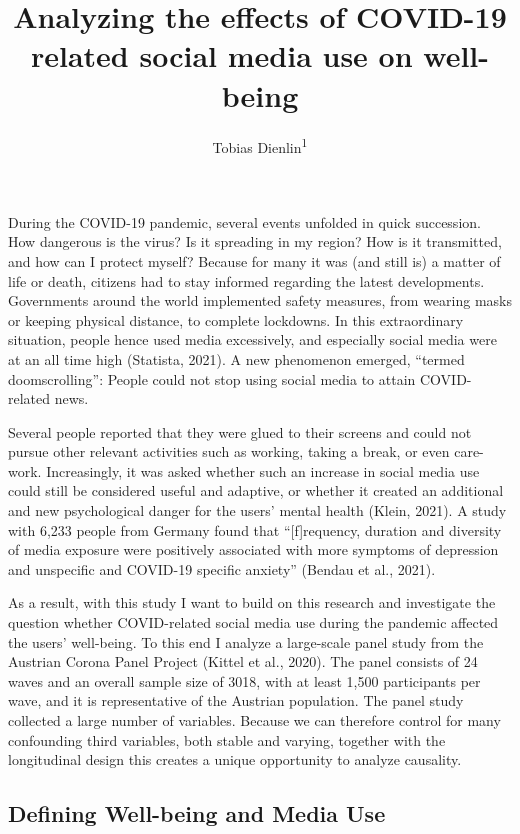 \documentclass[
  english,
  man,floatsintext]{apa6}
\title{Analyzing the effects of COVID-19 related social media use on well-being}
\author{Tobias Dienlin\textsuperscript{1}}
\date{}
\affiliation{\vspace{0.5cm}\textsuperscript{1} University of Vienna}
\begin{document}
\maketitle

During the COVID-19 pandemic,
several events unfolded in quick succession.
How dangerous is the virus? Is it spreading in my region? How is it transmitted, and how can I protect myself?
Because for many it was (and still is) a matter of life or death, citizens had to stay informed regarding the latest developments.
Governments around the world implemented safety measures, from wearing masks or keeping physical distance, to complete lockdowns.
In this extraordinary situation, people hence used media excessively, and especially social media were at an all time high (Statista, 2021).
A new phenomenon emerged, ``termed doomscrolling'':
People could not stop using social media to attain COVID-related news.

Several people reported that they were glued to their screens and could not pursue other relevant activities such as working, taking a break, or even care-work.
Increasingly, it was asked whether such an increase in social media use could still be considered useful and adaptive, or whether it created an additional and new psychological danger for the users' mental health (Klein, 2021).
A study with 6,233 people from Germany found that ``{[}f{]}requency, duration and diversity of media exposure were positively associated with more symptoms of depression and unspecific and COVID-19 specific anxiety'' (Bendau et al., 2021).

As a result, with this study I want to build on this research and investigate the question whether COVID-related social media use during the pandemic affected the users' well-being.
To this end I analyze a large-scale panel study from the Austrian Corona Panel Project (Kittel et al., 2020).
The panel consists of 24 waves and an overall sample size of 3018, with at least 1,500 participants per wave, and it is representative of the Austrian population.
The panel study collected a large number of variables.
Because we can therefore control for many confounding third variables, both stable and varying, together with the longitudinal design this creates a unique opportunity to analyze causality.

\hypertarget{defining-well-being-and-media-use}{%
\subsection{Defining Well-being and Media Use}\label{defining-well-being-and-media-use}}
\end{document}
